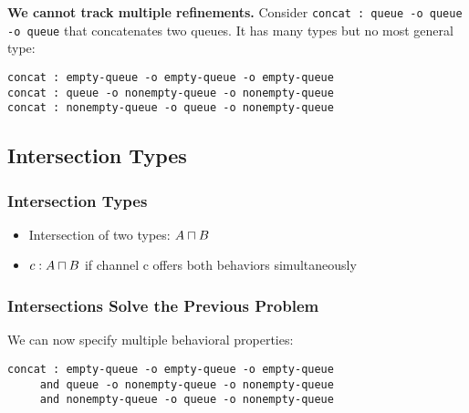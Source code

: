 \documentclass{beamer}
\begin{document}
\begin{frame}[fragile]
  \textbf{We cannot track multiple refinements.}
  \pause
  Consider \lstinline$concat : queue -o queue -o queue$ that concatenates two queues. It has many types but no most general type:

  \bigskip

  \begin{lstlisting}
concat : empty-queue -o empty-queue -o empty-queue
concat : queue -o nonempty-queue -o nonempty-queue
concat : nonempty-queue -o queue -o nonempty-queue
  \end{lstlisting}
\end{frame}

\subsection{Intersection Types}

\begin{frame}
  \frametitle{Intersection Types}
  \begin{itemize}
    \item Intersection of two types: $A \mathbin{\sqcap} B$
    \item $c : A \mathbin{\sqcap} B$ if channel c offers both behaviors simultaneously
  \end{itemize}

  \pause
  \bigskip

\end{frame}


\begin{frame}[fragile]
  \frametitle{Intersections Solve the Previous Problem}
   We can now specify multiple behavioral properties:

   \bigskip

  \begin{lstlisting}
concat : empty-queue -o empty-queue -o empty-queue
     and queue -o nonempty-queue -o nonempty-queue
     and nonempty-queue -o queue -o nonempty-queue
  \end{lstlisting}

\end{frame}
\end{document}
